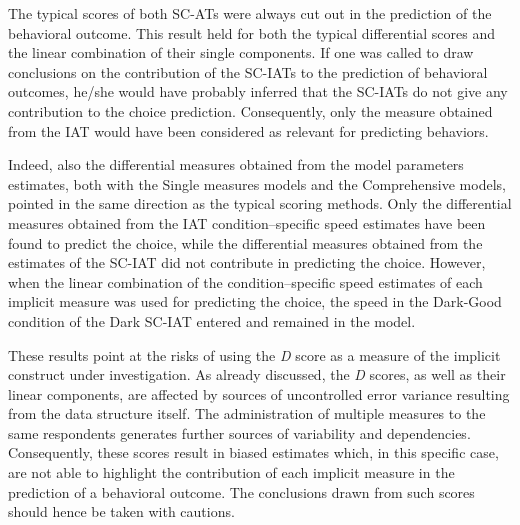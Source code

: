 \documentclass[12pt]{book}
\begin{document}
The typical scores of both SC-ATs were always cut out in the prediction of the behavioral outcome. 
This result held for both the typical differential scores and the linear combination of their single components. 
If one was called to draw conclusions on the contribution of the SC-IATs to the prediction of behavioral outcomes, he/she would have probably inferred that the SC-IATs do not give any contribution to the choice prediction. 
Consequently, only the measure obtained from the IAT would have been considered as relevant for predicting behaviors. 

Indeed, also the differential measures obtained from the model parameters estimates, both with the Single measures models and the Comprehensive models, pointed in the same direction as the typical scoring methods. 
Only the differential measures obtained from the IAT condition--specific speed estimates have been found to predict the choice, while the differential measures obtained from the estimates of the SC-IAT did not contribute in predicting the choice. 
However, when the linear combination of the condition--specific speed estimates of each implicit measure was used for predicting the choice, the speed in the Dark-Good condition of the Dark SC-IAT entered and remained in the model.  

These results point at the risks of using the \emph{D} score as a measure of the implicit construct under investigation. 
As already discussed, the \emph{D} scores, as well as their linear components, are affected by sources of uncontrolled error variance resulting from the data structure itself. 
The administration of multiple measures to the same respondents generates further sources of variability and dependencies.  
Consequently, these scores result in biased estimates which, in this specific case, are not able to highlight the contribution of each implicit measure in the prediction of a behavioral outcome. The conclusions drawn from such scores should hence be taken with cautions. 
\end{document}
